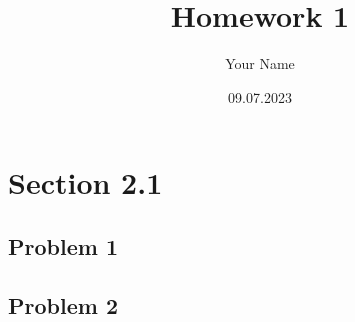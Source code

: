 \documentclass{article}
\title{Homework 1}
\author{Your Name}
\date{09.07.2023}
\begin{document}
\maketitle


\section*{Section 2.1}
\subsection*{Problem 1}
\subsection*{Problem 2}
\end{document}

